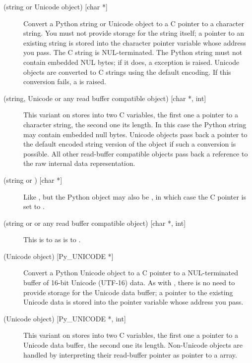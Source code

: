 \begin{description}
  \item[ (string or Unicode object) {[char *]}]
  Convert a Python string or Unicode object to a C pointer to a
  character string.  You must not provide storage for the string
  itself; a pointer to an existing string is stored into the character
  pointer variable whose address you pass.  The C string is
  NUL-terminated.  The Python string must not contain embedded NUL
  bytes; if it does, a  exception is raised.
  Unicode objects are converted to C strings using the default
  encoding.  If this conversion fails, a  is
  raised.

  \item[ (string, Unicode or any read buffer compatible object)
  {[char *, int]}]
  This variant on  stores into two C variables, the first one
  a pointer to a character string, the second one its length.  In this
  case the Python string may contain embedded null bytes.  Unicode
  objects pass back a pointer to the default encoded string version of
  the object if such a conversion is possible.  All other read-buffer
  compatible objects pass back a reference to the raw internal data
  representation.

  \item[ (string or ) {[char *]}]
  Like , but the Python object may also be , in
  which case the C pointer is set to \NULL.

  \item[ (string or  or any read buffer
  compatible object) {[char *, int]}]
  This is to  as  is to .

  \item[ (Unicode object) {[Py_UNICODE *]}]
  Convert a Python Unicode object to a C pointer to a NUL-terminated
  buffer of 16-bit Unicode (UTF-16) data.  As with , there is
  no need to provide storage for the Unicode data buffer; a pointer to
  the existing Unicode data is stored into the 
  pointer variable whose address you pass.

  \item[ (Unicode object) {[Py_UNICODE *, int]}]
  This variant on  stores into two C variables, the first one
  a pointer to a Unicode data buffer, the second one its length.
  Non-Unicode objects are handled by interpreting their read-buffer
  pointer as pointer to a  array.


\end{description}
